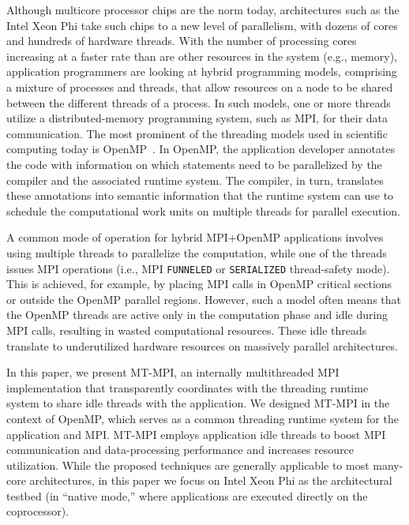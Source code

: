 
Although multicore processor chips are the norm today, architectures
such as the Intel Xeon Phi take such chips to a new level of
parallelism, with dozens of cores and hundreds of hardware threads.
With the number of processing cores increasing at a faster rate than
are other resources in the system (e.g., memory), application
programmers are looking at hybrid programming models, comprising a
mixture of processes and threads, that allow resources on a node to be
shared between the different threads of a process.  In such models,
one or more threads utilize a distributed-memory programming system,
such as MPI, for their data communication.  The most prominent of the
threading models used in scientific computing today is
OpenMP~\cite{openmp}.  In OpenMP, the application developer annotates
the code with information on which statements need to be parallelized
by the compiler and the associated runtime system.  The compiler, in
turn, translates these annotations into semantic information that the
runtime system can use to schedule the computational work units on
multiple threads for parallel execution.

A common mode of operation for hybrid MPI+OpenMP applications involves
using multiple threads to parallelize the computation, while one of
the threads issues MPI operations (i.e., MPI \texttt{FUNNELED} or
\texttt{SERIALIZED} thread-safety mode).  This is achieved, for
example, by placing MPI calls in OpenMP critical sections or outside
the OpenMP parallel regions.  However, such a model often means that
the OpenMP threads are active only in the computation phase and idle
during MPI calls, resulting in wasted computational resources.  These
idle threads translate to underutilized hardware resources on
massively parallel architectures.

In this paper, we present MT-MPI, an internally multithreaded MPI
implementation that transparently coordinates with the threading
runtime system to share idle threads with the application.  We
designed MT-MPI in the context of OpenMP, which serves as a common
threading runtime system for the application and MPI.  MT-MPI employs
application idle threads to boost MPI communication and
data-processing performance and increases resource utilization.  While
the proposed techniques are generally applicable to most many-core
architectures, in this paper we focus on Intel Xeon Phi as the
architectural testbed (in ``native mode,'' where applications are
executed directly on the coprocessor).

